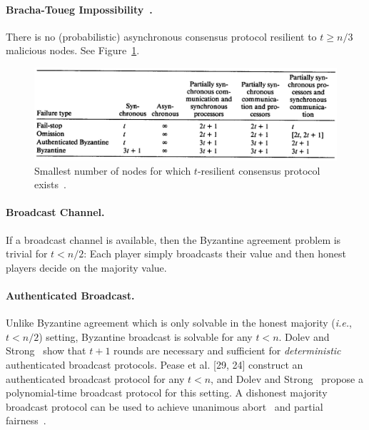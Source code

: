 \documentclass[11pt]{article}
\newcommand{\ie}{\textit{i.e.}}
\theoremstyle{mytheoremstyle}
\begin{document}
\paragraph{Bracha-Toueg Impossibility~\cite{Bracha:Toueg:1983}.} There is no (probabilistic) asynchronous consensus protocol resilient to $t \geq n/3$ malicious nodes. See Figure~\ref{fig:bounds}.

\begin{figure}
	\centering
	\includegraphics[width=0.9\linewidth]{bounds}
	\caption{Smallest number of nodes for which $t$-resilient consensus protocol exists~\cite{dwork:1988:cpp}.}
	\label{fig:bounds}
\end{figure}

\paragraph{Broadcast Channel.} If a broadcast channel is available, then the Byzantine agreement problem is trivial for $t<n/2$: Each player simply broadcasts their value and then honest players decide on the majority value.

\paragraph{Authenticated Broadcast.} Unlike Byzantine agreement which is only solvable in the honest majority (\ie, $t<n/2$) setting, Byzantine broadcast is solvable for any $t < n$. Dolev and Strong~\cite{Dolev:Strong:83} show that $t + 1$ rounds are necessary and sufficient for \emph{deterministic} authenticated broadcast protocols. Pease et al. [29, 24] construct an authenticated broadcast protocol for any $t < n$, and Dolev and Strong~\cite{Dolev:Strong:83} propose a polynomial-time broadcast protocol for this setting. A dishonest majority broadcast protocol can be used to achieve unanimous abort~\cite{goldwasser:2002:mpcnoba} and partial fairness~\cite{gradwohl:2006}.
\end{document}

